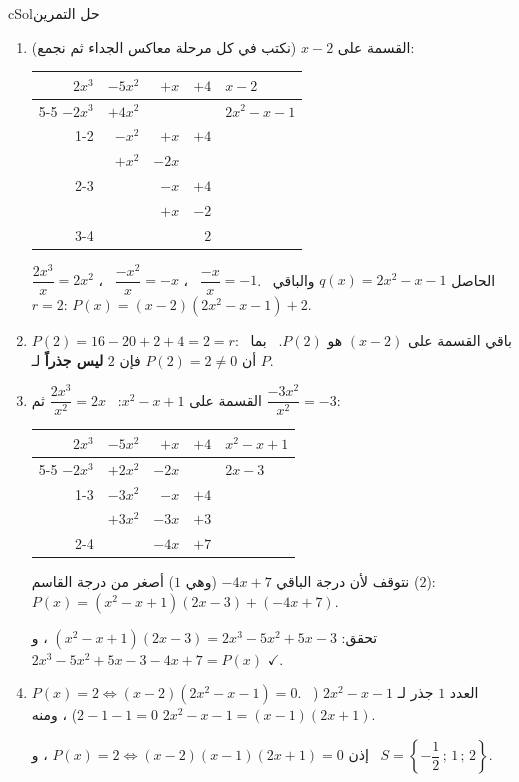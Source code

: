 \documentclass[12pt,a4paper]{article}
\newcounter{exo}
\newenvironment{hal}{\Needspace{12\baselineskip}\begin{otherlanguage}{english}\begin{arbox}[breakable]{cSol}{حل التمرين \theexo}}{\end{arbox}\end{otherlanguage}}
\newenvironment{LTR}{\begin{otherlanguage}{english}}{\end{otherlanguage}}
\begin{document}
\begin{hal}
\begin{enumerate}
\item القسمة على $x-2$ (نكتب في كل مرحلة معاكس الجداء ثم نجمع):
\begin{center}
\begin{LTR}
\renewcommand{\arraystretch}{1.3}
\begin{tabular}{rrrr|l}
$2x^3$ & $-5x^2$ & $+x$ & $+4$ & $x-2$\\\cline{5-5}
$-2x^3$ & $+4x^2$ &  &  & \textcolor{cDef}{$2x^2-x-1$}\\\cline{1-2}
 & $-x^2$ & $+x$ & $+4$ & \\
 & $+x^2$ & $-2x$ &  & \\\cline{2-3}
 &  & $-x$ & $+4$ & \\
 &  & $+x$ & $-2$ & \\\cline{3-4}
 &  &  & \textcolor{cThm}{$2$} & 
\end{tabular}
\end{LTR}
\end{center}
$\dfrac{2x^3}{x}=2x^2$ ، \ $\dfrac{-x^2}{x}=-x$ ، \ $\dfrac{-x}{x}=-1$. \ الحاصل $q(x)=2x^2-x-1$ والباقي $r=2$:
\quad $\boxed{P(x)=(x-2)\left(2x^2-x-1\right)+2}$.
\item $P(2)=16-20+2+4=2=r$: \ باقي القسمة على $(x-2)$ هو $P(2)$. \ بما أن $P(2)=2\neq0$ فإن $2$ \textbf{ليس جذراً} لـ $P$.
\item القسمة على $x^2-x+1$: \ $\dfrac{2x^3}{x^2}=2x$ ثم $\dfrac{-3x^2}{x^2}=-3$:
\begin{center}
\begin{LTR}
\renewcommand{\arraystretch}{1.3}
\begin{tabular}{rrrr|l}
$2x^3$ & $-5x^2$ & $+x$ & $+4$ & $x^2-x+1$\\\cline{5-5}
$-2x^3$ & $+2x^2$ & $-2x$ &  & \textcolor{cDef}{$2x-3$}\\\cline{1-3}
 & $-3x^2$ & $-x$ & $+4$ & \\
 & $+3x^2$ & $-3x$ & $+3$ & \\\cline{2-4}
 &  & \textcolor{cThm}{$-4x$} & \textcolor{cThm}{$+7$} & 
\end{tabular}
\end{LTR}
\end{center}
نتوقف لأن درجة الباقي $-4x+7$ (وهي $1$) أصغر من درجة القاسم ($2$): \quad $\boxed{P(x)=\left(x^2-x+1\right)(2x-3)+(-4x+7)}$.\par
تحقق: $\left(x^2-x+1\right)(2x-3)=2x^3-5x^2+5x-3$ ، و $2x^3-5x^2+5x-3-4x+7=P(x)$ $\checkmark$.
\item $P(x)=2\iff(x-2)\left(2x^2-x-1\right)=0$. \ العدد $1$ جذر لـ $2x^2-x-1$ ($2-1-1=0$) ، ومنه $2x^2-x-1=(x-1)(2x+1)$.\par
إذن $P(x)=2\iff(x-2)(x-1)(2x+1)=0$ ، و \ $\boxed{S=\left\{-\dfrac12\,;\,1\,;\,2\right\}}$.
\end{enumerate}
\end{hal}
\end{document}
